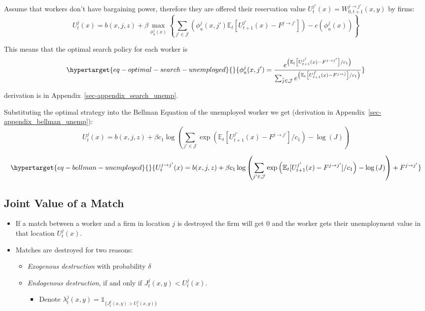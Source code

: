 \documentclass[
  letterpaper,
  DIV=11,
  numbers=noendperiod]{scrreprt}
\providecommand{\tightlist}{%
  \setlength{\itemsep}{0pt}\setlength{\parskip}{0pt}}\usepackage{longtable,booktabs,array}
\begin{document}
Assume that workers don't have bargaining power, therefore they are
offered their reservation value
\(U^{j'}_t(x)=W^{j\to j'}_{0, t+1}(x,y)\) by firms:
\[U^{j}_{t}(x) = b(x, j, z) + \beta \max_{\phi^j_u(x)} \left\{\sum_{j'\in \mathcal{J}} \left(\phi^j_u(x, j')\mathbb{E}_t\left[U^{j'}_{t+1}(x) - F^{j \to j'}\right]\right) -c(\phi^j_u(x)) \right\} \]

This means that the optimal search policy for each worker is
\begin{equation}\protect\hypertarget{eq-optimal-search-unemployed}{}{ \phi^j_u(x,j') = \frac{e^{\left(\mathbb{E}_t\left[U^{j'}_{t+1}(x) - F^{j \to j'}\right] /c_1\right)}}{\sum_{\tilde{j}\in \mathcal{J}}e^{\left(\mathbb{E}_t\left[U^{\tilde{f}}_{t+1}(x) - F^{j \to \tilde{j}}\right] /c_1\right)}}}\label{eq-optimal-search-unemployed}\end{equation}

derivation is in Appendix~\ref{sec-appendix_search_unemp}.

Substituting the optimal strategy into the Bellman Equation of the
unemployed worker we get (derivation in
Appendix~\ref{sec-appendix_bellman_unemp}):
\[U^{j}_{t}(x) = b(x, j, z) + \beta c_1 \log{\left( \sum_{j' \in \mathcal{J}}\exp{\left(\mathbb{E}_t[U_{t+1}^{j'}(x) - F^{j \to j'}]/c_1\right)}-\log{(J)}\right)}\]

\begin{equation}\protect\hypertarget{eq-bellman-unemployed}{}{U^{j \to j'}_{t}(x)=b(x, j, z) + \beta c_1 \log{\left( \sum_{j' \in \mathcal{J}}\exp{\left(\mathbb{E}_t[U_{t+1}^{j'}(x) - F^{j \to j'}]/c_1\right)}-\log{(J)}\right)} + F^{j \to j'}}\label{eq-bellman-unemployed}\end{equation}

\hypertarget{joint-value-of-a-match}{%
\subsection{Joint Value of a Match}\label{joint-value-of-a-match}}

\begin{itemize}
\tightlist
\item
  If a match between a worker and a firm in location \(j\) is destroyed
  the firm will get \(0\) and the worker gets their unemployment value
  in that location \(U^j_t(x)\).
\item
  Matches are destroyed for two reasons:

  \begin{itemize}
  \tightlist
  \item
    \emph{Exogenous destruction} with probability \(\delta\)
  \item
    \emph{Endogenous destruction}, if and only if
    \(J^j_t(x,y) < U^j_t(x)\).

    \begin{itemize}
    \tightlist
    \item
      Denote
      \(\lambda^j_{t}(x,y) = \mathbb{1}_{\{J^j_{t}(x,y)>U^j_{t}(x,y)\}}\)
    \end{itemize}
  \end{itemize}
\end{itemize}
\end{document}
